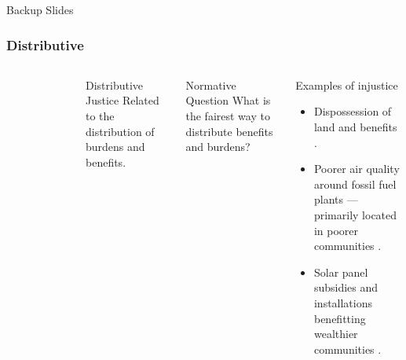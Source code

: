 \begin{frame}
    Backup Slides
\end{frame}



\begin{frame}
    \frametitle{Distributive}
    \begin{columns}
        \column[t]{3cm}
        \begin{figure}
            \centering
        \end{figure}
        \column[t]{7cm}
        \begin{block}{Distributive Justice}
            Related to the distribution of burdens and benefits.
        \end{block}
        \begin{block}{Normative Question}
            What is the fairest way to distribute benefits and burdens?
        \end{block}
        \begin{block}{Examples of injustice}
            \begin{itemize}
                \item Dispossession of land and benefits
                \cite{yenneti_spatial_2016,sovacool_dispossessed_2021}. 
                \item Poorer air quality around fossil fuel plants --- primarily
                located in poorer communities \cite{mohai_which_2015}.
                \item Solar panel subsidies and installations benefitting
                wealthier communities \cite{reames_distributional_2020}.
            \end{itemize}
        \end{block}
    \end{columns}
    
\end{frame}

